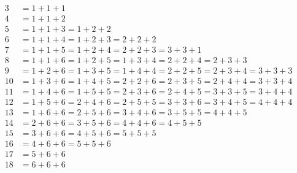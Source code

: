 \documentclass[9pt]{beamer}
\begin{document}
\begin{frame}[fragile,t] %
 \begin{align*}
    3  & = 1 + 1 + 1                                                             \\
    4  & = 1 + 1 + 2                                                             \\
    5  & = 1 + 1 + 3 = 1 + 2 + 2                                                 \\
    6  & = 1 + 1 + 4 = 1 + 2 + 3 = 2 + 2 + 2                                     \\
    7  & = 1 + 1 + 5 = 1 + 2 + 4 = 2 + 2 + 3 = 3 + 3 + 1                         \\
    8  & = 1 + 1 + 6 = 1 + 2 + 5 = 1 + 3 + 4 = 2 + 2 + 4 = 2 + 3 + 3             \\
    9  & = 1 + 2 + 6 = 1 + 3 + 5 = 1 + 4 + 4 = 2 + 2 + 5 = 2 + 3 + 4 = 3 + 3 + 3 \\
    10 & = 1 + 3 + 6 = 1 + 4 + 5 = 2 + 2 + 6 = 2 + 3 + 5 = 2 + 4 + 4 = 3 + 3 + 4 \\
    11 & = 1 + 4 + 6 = 1 + 5 + 5 = 2 + 3 + 6 = 2 + 4 + 5 = 3 + 3 + 5 = 3 + 4 + 4 \\
    12 & = 1 + 5 + 6 = 2 + 4 + 6 = 2 + 5 + 5 = 3 + 3 + 6 = 3 + 4 + 5 = 4 + 4 + 4 \\
    13 & = 1 + 6 + 6 = 2 + 5 + 6 = 3 + 4 + 6 = 3 + 5 + 5 = 4 + 4 + 5             \\
    14 & = 2 + 6 + 6 = 3 + 5 + 6 = 4 + 4 + 6 = 4 + 5 + 5                         \\
    15 & = 3 + 6 + 6 = 4 + 5 + 6 = 5 + 5 + 5                                     \\
    16 & = 4 + 6 + 6 = 5 + 5 + 6                                                 \\
    17 & = 5 + 6 + 6                                                             \\
    18 & = 6 + 6 + 6
 \end{align*}
\end{frame}
\end{document}
